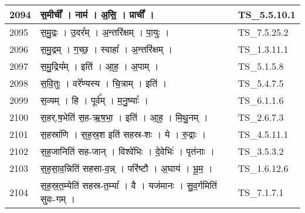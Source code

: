 \documentclass[17pt]{extarticle}
\begin{document}
\begin{longtable}{||p{0.4in}||p{4.9in}||p{0.9in}||}
    \hline
        
    2094 & स॒मीची᳚   ।   नाम॑   ।   अ॒सि॒   ।   प्राची᳚   ।    & TS\_5.5.10.1       \\
    
    \hline
        
    2095 & स॒मु॒द्रः   ।   उ॒दर᳚म्   ।   अ॒न्तरि॑क्षम्   ।   पा॒युः   ।    & TS\_7.5.25.2       \\
    
    \hline
        
    2096 & स॒मु॒द्रम्   ।   ग॒च्छ॒   ।   स्वाहा᳚   ।   अ॒न्तरि॑क्षम्   ।    & TS\_1.3.11.1       \\
    
    \hline
        
    2097 & स॒मु॒द्रिय᳚म्   ।   इति॑   ।   आ॒ह॒   ।   अ॒पाम्   ।    & TS\_5.1.5.8       \\
    
    \hline
        
    2098 & स॒वि॒तुः   ।   वरे᳚ण्यस्य   ।   चि॒त्राम्   ।   इति॑   ।    & TS\_5.4.7.5       \\
    
    \hline
        
    2099 & स॒व्यम्   ।   हि   ।   पूर्व᳚म्   ।   म॒नु॒ष्याः᳚   ।    & TS\_6.1.1.6       \\
    
    \hline
        
    2100 & स॒हर्.ष॒भेति॑ स॒ह{-}ऋ॒ष॒भा॒   ।   इति॑   ।   आ॒ह॒   ।   मि॒थु॒नम्   ।    & TS\_2.6.7.3       \\
    
    \hline
        
    2101 & स॒हस्रा॑णि   ।   स॒ह॒स्र॒श इति॑ सहस्र{-}शः   ।   ये   ।   रु॒द्राः   ।    & TS\_4.5.11.1       \\
    
    \hline
        
    2102 & स॒ह॒जानिति॑ सह{-}जान्   ।   विश्वे॑भिः   ।   दे॒वेभिः॑   ।   पृत॑नाः   ।    & TS\_3.5.3.2       \\
    
    \hline
        
    2103 & स॒ह॒सा॒व॒न्निति॑ सहसा{-}व॒न्न्   ।   परि॑ष्टौ   ।   अ॒घाय॑   ।   भू॒म॒   ।    & TS\_1.6.12.6       \\
    
    \hline
        
    2104 & स॒ह॒स्र॒त॒म्येति॑ सहस्र{-}त॒म्या᳚   ।   वै   ।   यज॑मानः   ।   सु॒व॒र्गमिति॑ सुवः{-}गम्   ।    & TS\_7.1.7.1       \\
    

\end{longtable}
\end{document}
